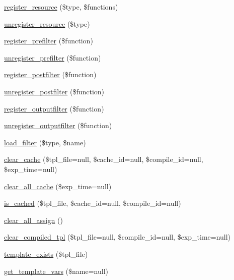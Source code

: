 \begin{DoxyCompactItemize}
\item 
\hyperlink{class_smarty_b_c_a27683a72840c9401cde24eec57d493df}{register\+\_\+resource} (\$type, \$functions)
\item 
\hyperlink{class_smarty_b_c_a509d4408ce20f6def85118984b81a32e}{unregister\+\_\+resource} (\$type)
\item 
\hyperlink{class_smarty_b_c_afdd4dead058273890d629d207f236239}{register\+\_\+prefilter} (\$function)
\item 
\hyperlink{class_smarty_b_c_a8208fd226842f48de08ce37305295d64}{unregister\+\_\+prefilter} (\$function)
\item 
\hyperlink{class_smarty_b_c_a1eb31d2b852e5862a3d04284614d145b}{register\+\_\+postfilter} (\$function)
\item 
\hyperlink{class_smarty_b_c_a36d917f9b975efc48682198c705eb244}{unregister\+\_\+postfilter} (\$function)
\item 
\hyperlink{class_smarty_b_c_a54426aae9228293c47e05f4ceaacd516}{register\+\_\+outputfilter} (\$function)
\item 
\hyperlink{class_smarty_b_c_a8d7427d8dc5f3d71aeb3385b9aad3700}{unregister\+\_\+outputfilter} (\$function)
\item 
\hyperlink{class_smarty_b_c_ad642cca94486c492c56071fb32a3421c}{load\+\_\+filter} (\$type, \$name)
\item 
\hyperlink{class_smarty_b_c_a6b5412f074996dea92d89b32a13880d8}{clear\+\_\+cache} (\$tpl\+\_\+file=null, \$cache\+\_\+id=null, \$compile\+\_\+id=null, \$exp\+\_\+time=null)
\item 
\hyperlink{class_smarty_b_c_aaf1eab6e680746ae852abfc3814382fb}{clear\+\_\+all\+\_\+cache} (\$exp\+\_\+time=null)
\item 
\hyperlink{class_smarty_b_c_a70d12433755791c1383f394b6a41271d}{is\+\_\+cached} (\$tpl\+\_\+file, \$cache\+\_\+id=null, \$compile\+\_\+id=null)
\item 
\hyperlink{class_smarty_b_c_a47a576000a48c74fea66a209d7f0ac21}{clear\+\_\+all\+\_\+assign} ()
\item 
\hyperlink{class_smarty_b_c_a71153cdee03c4dcb864488b59442b162}{clear\+\_\+compiled\+\_\+tpl} (\$tpl\+\_\+file=null, \$compile\+\_\+id=null, \$exp\+\_\+time=null)
\item 
\hyperlink{class_smarty_b_c_abfade212562dbeff89ccf453c02f5a1b}{template\+\_\+exists} (\$tpl\+\_\+file)
\item 
\hyperlink{class_smarty_b_c_a11cdf1965341e01ab5790d3cc13763c7}{get\+\_\+template\+\_\+vars} (\$name=null)
\item 

\end{DoxyCompactItemize}
